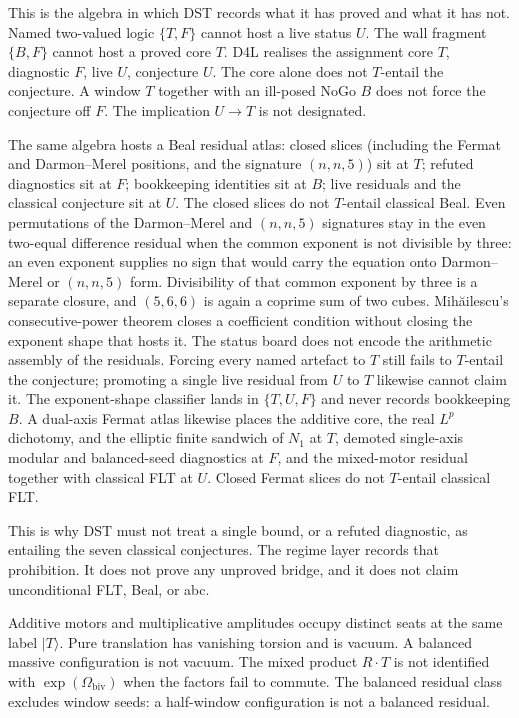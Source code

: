 \documentclass[a4paper]{article}
\theoremstyle{definition}
\begin{document}
This is the algebra in which DST records what it has proved and what it
has not. Named two-valued logic \(\{T,F\}\) cannot host a live status
\(U\). The wall fragment \(\{B,F\}\) cannot host a proved core \(T\).
D4L realises the assignment core \(T\), diagnostic \(F\), live \(U\),
conjecture \(U\). The core alone does not \(T\)-entail the conjecture.
A window \(T\) together with an ill-posed NoGo \(B\) does not force the
conjecture off \(F\). The implication \(U\to T\) is not designated.

The same algebra hosts a Beal residual atlas: closed slices (including
the Fermat and Darmon--Merel positions, and the signature \((n,n,5)\))
sit at \(T\); refuted diagnostics sit at \(F\); bookkeeping identities
sit at \(B\); live residuals and the classical conjecture sit at \(U\).
The closed slices do not \(T\)-entail classical Beal. Even permutations
of the Darmon--Merel and \((n,n,5)\) signatures stay in the even
two-equal difference residual when the common exponent is not divisible
by three: an even exponent supplies no sign that would carry the
equation onto Darmon--Merel or \((n,n,5)\) form. Divisibility of that
common exponent by three is a separate closure, and \((5,6,6)\) is
again a coprime sum of two cubes. Mihăilescu's consecutive-power theorem closes a
coefficient condition without closing the exponent shape that hosts it.
The status board does not encode the arithmetic assembly of the
residuals. Forcing every named artefact to \(T\) still fails to
\(T\)-entail the conjecture; promoting a single live residual from
\(U\) to \(T\) likewise cannot claim it. The exponent-shape classifier
lands in \(\{T,U,F\}\) and never records bookkeeping \(B\).
A dual-axis Fermat atlas likewise places the additive core, the real
\(L^p\) dichotomy, and the elliptic finite sandwich of \(N_1\) at \(T\),
demoted single-axis modular and balanced-seed diagnostics at \(F\), and
the mixed-motor residual together with classical FLT at \(U\). Closed
Fermat slices do not \(T\)-entail classical FLT.

This is why DST must not treat a single bound, or a refuted diagnostic,
as entailing the seven classical conjectures. The regime layer records
that prohibition. It does not prove any unproved bridge, and it does
not claim unconditional FLT, Beal, or abc.

Additive motors and multiplicative amplitudes occupy distinct seats at
the same label \(\lvert T\rangle\). Pure translation has vanishing
torsion and is vacuum. A balanced massive configuration is not vacuum.
The mixed product \(R\cdot T\) is not identified with
\(\exp(\Omega_{\mathrm{biv}})\) when the factors fail to commute. The
balanced residual class excludes window seeds: a half-window
configuration is not a balanced residual.
\end{document}
